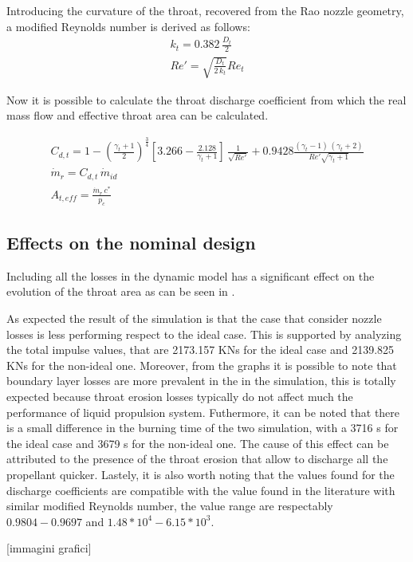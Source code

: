 \begin{itemize}
    Introducing the curvature of the throat, recovered from the Rao nozzle geometry, a modified Reynolds number is derived as follows:
    \begin{gather}
        k_t = 0.382 \, \frac{D_t}{2} \\
        Re'=\sqrt{\frac{D_t}{2 \, k_t}}Re_t
    \end{gather}  

    Now it is possible to calculate the throat discharge coefficient from which the real mass flow and effective throat area can be calculated.  

    \begin{gather}
        C_{d,t} = 1 - \left( \frac{\gamma_t+1}{2} \right)^{\frac{3}{4}}
        \left[3.266 - \frac{2.128}{\gamma_t+1} \right] \, \frac{1}{\sqrt{Re'}} + 0.9428 \frac{(\gamma_t - 1) \, (\gamma_t + 2)}{Re' \sqrt{\gamma_t + 1}} \\
        \dot{m}_r = C_{d,t} \, \dot{m}_{id} \\
        A_{t,eff} = \frac{\dot{m}_r \, c^*}{p_c}
    \end{gather}
\end{itemize}

\subsection{Effects on the nominal design}  

Including all the losses in the dynamic model has a significant effect on the evolution of the throat area as can be seen in \mref.


As expected the result of the simulation is that the case that consider nozzle losses is less performing respect to the ideal case. This is supported by analyzing the total impulse values, that are 2173.157 KNs for the ideal case and 2139.825 KNs for the non-ideal one. Moreover, from the graphs it is possible to note that boundary layer losses are more prevalent in the in the simulation, this is totally expected because throat erosion losses typically do not affect much the performance of liquid propulsion system.  Futhermore, it can be noted that there is a small difference in the burning time of the two simulation, with a 3716 s for the ideal case and 3679 s for the non-ideal one. The cause of this effect can be attributed to the presence of the throat erosion that allow to discharge all the propellant quicker. Lastely, it is also worth noting that the values found for the discharge coefficients are compatible with the value found in the literature with similar modified Reynolds number, the value range are respectably $0.9804-0.9697$ and $1.48*10^4-6.15*10^3$.    

[immagini grafici]
